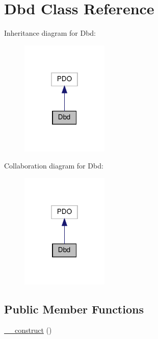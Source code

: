 \hypertarget{class_app_1_1_dbd}{}\section{Dbd Class Reference}
\label{class_app_1_1_dbd}


Inheritance diagram for Dbd\+:
\nopagebreak
\begin{figure}[H]
\begin{center}
\leavevmode
\includegraphics[width=118pt]{class_app_1_1_dbd__inherit__graph}
\end{center}
\end{figure}


Collaboration diagram for Dbd\+:
\nopagebreak
\begin{figure}[H]
\begin{center}
\leavevmode
\includegraphics[width=118pt]{class_app_1_1_dbd__coll__graph}
\end{center}
\end{figure}
\subsection*{Public Member Functions}
\begin{DoxyCompactItemize}
\item 
\hyperlink{class_app_1_1_dbd_a095c5d389db211932136b53f25f39685}{\+\_\+\+\_\+construct} ()
\end{DoxyCompactItemize}


